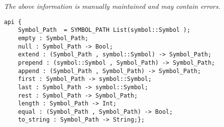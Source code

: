 \label{api:Symbol\_Path}

{\tiny \it The above information is manually maintained and may contain errors.}
\begin{verbatim}
api {
    Symbol_Path  = SYMBOL_PATH List(symbol::Symbol );
    empty : Symbol_Path;
    null : Symbol_Path -> Bool;
    extend : (Symbol_Path , symbol::Symbol) -> Symbol_Path;
    prepend : (symbol::Symbol , Symbol_Path) -> Symbol_Path;
    append : (Symbol_Path , Symbol_Path) -> Symbol_Path;
    first : Symbol_Path -> symbol::Symbol;
    last : Symbol_Path -> symbol::Symbol;
    rest : Symbol_Path -> Symbol_Path;
    length : Symbol_Path -> Int;
    equal : (Symbol_Path , Symbol_Path) -> Bool;
    to_string : Symbol_Path -> String;};
\end{verbatim}

